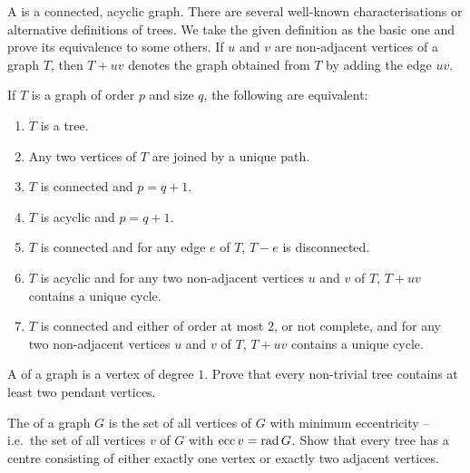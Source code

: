 A  is a connected, acyclic graph. There are several well-known characterisations or alternative definitions of trees. We take the given definition as the basic one and prove its equivalence to some others. If $u$ and $v$ are non-adjacent vertices of a graph $T$, then $T+uv$ denotes the graph obtained from $T$ by adding the edge $uv$.

\begin{Theorem}\label{thm:Conn;p=q+1}
If $T$ is a graph of order $p$ and size $q$, the following are equivalent:
\begin{enumerate}[label =(\roman*)]
\item $T$ is a tree.
\item Any two vertices of $T$ are joined by a unique path.
\item $T$ is connected and $p = q + 1$.
\item $T$ is acyclic and $p = q + 1$.
\item $T$ is connected and for any edge $e$ of $T$, $T - e$ is disconnected.
\item $T$ is acyclic and for any two non-adjacent vertices $u$ and $v$ of $T$, $T + uv$ contains a unique cycle.
\item $T$ is connected and either of order at most $2$, or not complete, and for any two non-adjacent vertices $u$ and $v$ of $T$, $T + uv$ contains a unique cycle. 
\end{enumerate}
\end{Theorem}


\begin{Exercise}
A  of a graph is a vertex of degree $1$. Prove that every non-trivial tree contains at least two pendant vertices.\\
\end{Exercise}

\begin{Exercise}
The  of a graph $G$ is the set of all vertices of $G$ with minimum eccentricity -- i.e.\ the set of all vertices $v$ of $G$ with $\operatorname{ecc} v = \operatorname{rad} G$. Show that every tree has a centre consisting of either exactly one vertex or exactly two adjacent vertices.\\
\end{Exercise}

